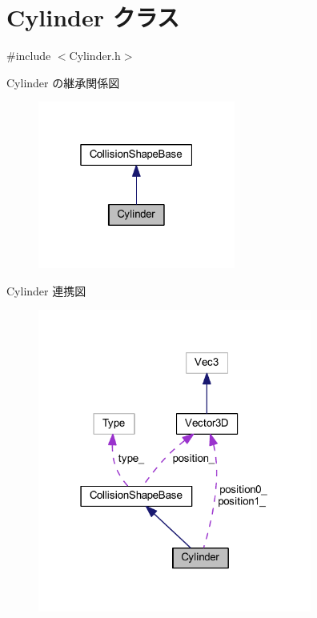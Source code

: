 \hypertarget{class_cylinder}{}\section{Cylinder クラス}
\label{class_cylinder}


{\ttfamily \#include $<$Cylinder.\+h$>$}



Cylinder の継承関係図\nopagebreak
\begin{figure}[H]
\begin{center}
\leavevmode
\includegraphics[width=184pt]{class_cylinder__inherit__graph}
\end{center}
\end{figure}


Cylinder 連携図\nopagebreak
\begin{figure}[H]
\begin{center}
\leavevmode
\includegraphics[width=255pt]{class_cylinder__coll__graph}
\end{center}
\end{figure}
